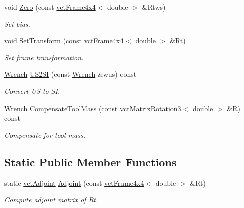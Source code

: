 \begin{DoxyCompactItemize}
void \hyperlink{classosa_j_r3_force_sensor_aaaca311243f3906a23acfa1422981a71}{Zero} (const \hyperlink{classvct_frame4x4}{vct\+Frame4x4}$<$ double $>$ \&Rtws)
\begin{DoxyCompactList}\small\item\em Set bias. \end{DoxyCompactList}\item 
void \hyperlink{classosa_j_r3_force_sensor_a91ce3f4e0c5b2a8293abf85a7e75afbd}{Set\+Transform} (const \hyperlink{classvct_frame4x4}{vct\+Frame4x4}$<$ double $>$ \&Rt)
\begin{DoxyCompactList}\small\item\em Set frame transformation. \end{DoxyCompactList}\item 
\hyperlink{classosa_j_r3_force_sensor_afcfc2ba175b2e7ef9f86c6394c8966d2}{Wrench} \hyperlink{classosa_j_r3_force_sensor_aa76b7cf966facceaa220f46bd7c71265}{U\+S2\+S\+I} (const \hyperlink{classosa_j_r3_force_sensor_afcfc2ba175b2e7ef9f86c6394c8966d2}{Wrench} \&wus) const 
\begin{DoxyCompactList}\small\item\em Convert U\+S to S\+I. \end{DoxyCompactList}\item 
\hyperlink{classosa_j_r3_force_sensor_afcfc2ba175b2e7ef9f86c6394c8966d2}{Wrench} \hyperlink{classosa_j_r3_force_sensor_a25e6c9de5e0e7c948dea2bc0d2a0231e}{Compensate\+Tool\+Mass} (const \hyperlink{classvct_matrix_rotation3}{vct\+Matrix\+Rotation3}$<$ double $>$ \&R) const 
\begin{DoxyCompactList}\small\item\em Compensate for tool mass. \end{DoxyCompactList}\end{DoxyCompactItemize}
\subsection*{Static Public Member Functions}
\begin{DoxyCompactItemize}
\item 
static \hyperlink{classosa_j_r3_force_sensor_af769666ad69e4db31c2891ddf67d2abd}{vct\+Adjoint} \hyperlink{classosa_j_r3_force_sensor_ab8639c1152c6002572eb8339c045982d}{Adjoint} (const \hyperlink{classvct_frame4x4}{vct\+Frame4x4}$<$ double $>$ \&Rt)
\begin{DoxyCompactList}\small\item\em Compute adjoint matrix of Rt. \end{DoxyCompactList}\end{DoxyCompactItemize}



